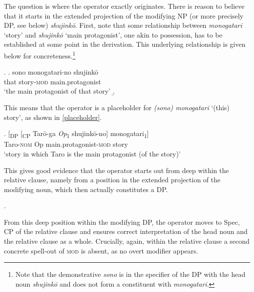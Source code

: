 \documentclass [output=book,colorlinks,citecolor=brown]{langscibook}
\begin{document}
The question is where the operator exactly originates. There is reason to believe that it starts in the extended projection of the modifying NP (or more precisely DP, see below) \textit{shujinkō}. First, note that some relationship between \textit{monogatari} `story’ and \textit{shujinkō} `main protagonist’, one akin to possession, has to be established at some point in the derivation. This underlying relationship is given below for concreteness.\footnote{Note that the demonstrative \textit{sono} is in the specifier of the DP with the head noun \textit{shujinkō} and does not form a constituent with \textit{monogatari}.}

\ex. \ag. sono monogatari-no shujinkō\\
that story-\textsc{mod} main.protagonist\\
`the main protagonist of that story’
\b. 

This means that the operator is a placeholder for \textit{(sono) monogatari} `(this) story’, as shown in \ref{placeholder}. %

\exg. [\textsubscript{DP} [\textsubscript{CP} Tarō-ga \textit{Op}\textsubscript{1} shujinkō-no] monogatari\textsubscript{1}]\\
{} {} Taro-\textsc{nom} Op main.protagonist-\textsc{mod} story\\
`story in which Taro is the main protagonist (of the story)’ \label{placeholder}

This gives good evidence that the operator starts out from deep within the relative clause, namely from a position in the extended projection of the modifying noun, which then actually constitutes a DP.

\ex. 

From this deep position within the modifying DP, the operator moves to Spec, CP of the relative clause and ensures correct interpretation of the head noun and the relative clause as a whole. Crucially, again, within the relative clause a second concrete spell-out of \textsc{mod} is absent, as no overt modifier appears.
\end{document}
